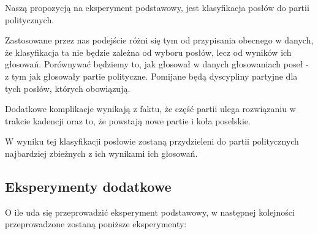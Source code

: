 \documentclass[a4 14pt]{report}
\begin{document}
			Naszą propozycją na eksperyment podstawowy, jest klasyfikacja posłów do partii politycznych. 
			
			Zastosowane przez nas podejście różni się tym od przypisania obecnego w danych, że klasyfikacja ta nie będzie zależna od wyboru posłów, lecz od wyników ich głosowań.
			Porównywać będziemy to, jak głosował w danych głosowaniach poseł - z tym jak głosowały partie polityczne. Pomijane będą dyscypliny partyjne dla tych posłów, których obowiązują.
			
			Dodatkowe komplikacje wynikają z faktu, że część partii ulega rozwiązaniu w trakcie kadencji oraz to, że powstają nowe partie i koła poselskie.

			W wyniku tej klasyfikacji posłowie zostaną przydzieleni do partii politycznych najbardziej zbieżnych z ich wynikami ich głosowań.
			
		\subsection{Eksperymenty dodatkowe}
			
			O ile uda się przeprowadzić eksperyment podstawowy, w następnej kolejności przeprowadzone zostaną poniższe eksperymenty:
\end{document}
